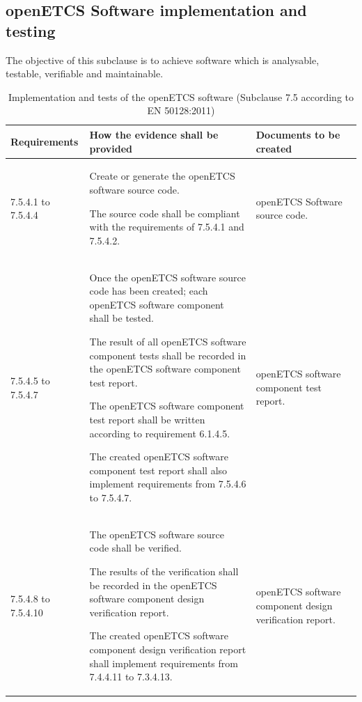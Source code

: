 \documentclass{template/openetcs_report}
\begin{document}
\subsection{openETCS Software implementation and testing}
\begin{flushleft}
The objective of this subclause is to achieve software which is analysable, testable, verifiable and maintainable.
\end{flushleft}
{\footnotesize\sffamily\centering
\begin{longtable}{|p{2cm}|p{9cm}|p{3cm}|}
\caption{Implementation and tests of the openETCS software (Subclause 7.5 according to EN 50128:2011)}\\
\hline
\bfseries Requirements & \bfseries How the evidence shall be provided & \bfseries Documents to be created\\
\hline
\hline
\endhead
\hline
\endfoot

7.5.4.1 to 7.5.4.4 & Create or generate the openETCS software source code.

The source code shall be compliant with the requirements of 7.5.4.1 and 7.5.4.2.
& openETCS Software source code.\\ 
\hline
7.5.4.5 to 7.5.4.7 & Once the openETCS software source code has been created; each openETCS software component shall be tested.

The result of all openETCS software component tests shall be recorded in the openETCS software component test report.

The openETCS software component test report shall be written according to requirement 6.1.4.5.

The created openETCS software component test report shall also implement requirements from 7.5.4.6 to 7.5.4.7.
& openETCS software component test report.\\ 
\hline
7.5.4.8 to 7.5.4.10 & The openETCS software source code shall be verified.

The results of the verification shall be recorded in the openETCS software component design verification report.

The created openETCS software component design verification report shall implement requirements from 7.4.4.11 to 7.3.4.13.
& openETCS software component design verification report.\\ 
\hline
\end{longtable}}
\end{document}
